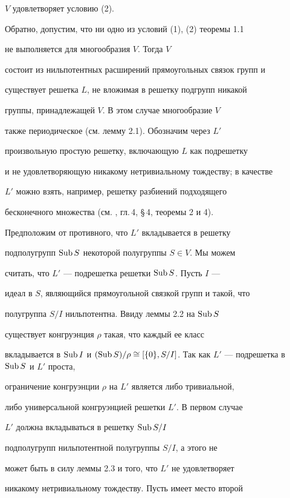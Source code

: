 $V$ удовлетворяет условию (2).





Обратно, допустим, что ни одно из условий (1), (2) теоремы 1.1


не выполняется для многообразия $V$. Тогда $V$


состоит из нильпотентных расширений прямоугольных связок групп и


существует решетка $L$, не вложимая в решетку подгрупп никакой


группы, принадлежащей $V$. В этом случае многообразие $V$


также периодическое (см. лемму 2.1). Обозначим через $L'$


произвольную простую решетку, включающую $L$ как подрешетку


и не удовлетворяющую никакому нетривиальному тождеству; в качестве


$L'$ можно взять, например, решетку разбиений подходящего


бесконечного множества (см. \cite{Grat}, гл.\,4, \S\,4, теоремы 2 и 4).


Предположим от противного, что $L'$ вкладывается в решетку


подполугрупп $\operatorname{Sub} S$ некоторой полугруппы $S \in V$. Мы можем


считать, что $L'$ --- подрешетка решетки $\operatorname{Sub} S$. Пусть $I$ ---


идеал в $S$, являющийся прямоугольной связкой групп и такой, что


полугруппа $S/I$ нильпотентна. Ввиду леммы 2.2 на $\operatorname{Sub} S$


существует конгруэнция $\rho$ такая, что каждый ее класс


вкладывается в $\Sub I$ и $(\Sub S)/\rho \cong [\{0\},


S/I]$. Так как $L'$ --- подрешетка в $\Sub S$ и $L'$ проста,


ограничение конгруэнции $\rho$ на $L'$ является либо тривиальной,


либо универсальной конгруэнцией решетки $L'$. В первом случае


$L'$ должна вкладываться в решетку $\operatorname{Sub} S/I$


подполугрупп нильпотентной полугруппы $S/I$, а этого не


может быть в силу леммы 2.3 и того, что $L'$ не удовлетворяет


никакому нетривиальному тождеству. Пусть имеет место второй


